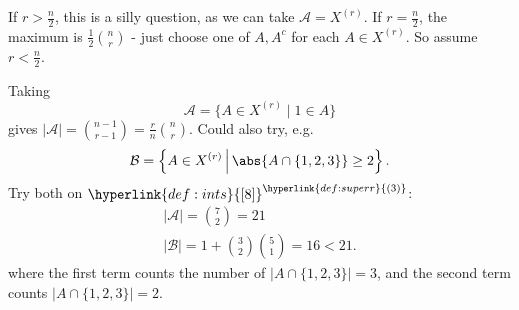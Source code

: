 \documentclass{article}
\newcommand{\A}{\mathcal{A}}
\begin{document}
If $r > \frac{n}{2}$, this is a silly question, as we can take $\A = X^{(r)}$.
If $r = \frac{n}{2}$, the maximum is $\frac{1}{2} \binom nr$ - just choose one of $A,A^c$ for each $A \in X^{(r)}$.
So assume $r < \frac{n}{2}$.

Taking
\begin{equation*}\mathcal{A} = \{A \in X^{(r)} \mid 1 \in A\}\end{equation*}
gives $|\A| = \binom{n-1}{r-1} = \frac{r}{n} \binom nr$.
Could also try, e.g.\
\begin{equation*}\mathcal{B} = \left\{A \in X^{(r)}\, \middle|\,\abs{A \cap \{1,2,3\}} \geq 2\right\}.\end{equation*}
Try both on $\hyperlink{def:ints}{[8]}^{\hyperlink{def:superr}{(3)}}$:
\begin{gather*}
  |\A| = \binom{7}{2} = 21 \\
  |\mathcal{B}| = 1 + \binom{3}{2} \binom{5}{1} = 16 < 21.
\end{gather*}
where the first term counts the number of $|A \cap \{1,2,3\}| = 3$, and the second term counts $|A \cap \{1,2,3\}| = 2$.
\end{document}
